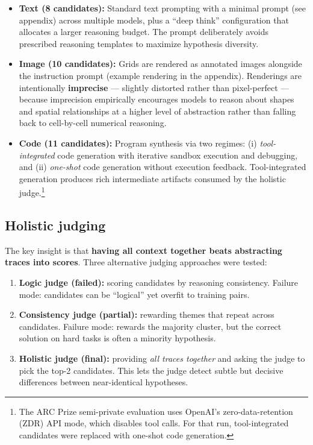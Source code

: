 \documentclass[10pt]{article}
\providecommand{\tightlist}{%
  \setlength{\itemsep}{0pt}\setlength{\parskip}{0pt}}
\begin{document}
\begin{itemize}
\tightlist
\item
  \textbf{Text (8 candidates):} Standard text prompting with a minimal
  prompt (see appendix) across multiple models, plus a ``deep think''
  configuration that allocates a larger reasoning budget. The prompt
  deliberately avoids prescribed reasoning templates to maximize
  hypothesis diversity.
\item
  \textbf{Image (10 candidates):} Grids are rendered as annotated images
  alongside the instruction prompt (example rendering in the appendix).
  Renderings are intentionally \textbf{imprecise} --- slightly distorted
  rather than pixel-perfect --- because imprecision empirically
  encourages models to reason about shapes and spatial relationships at
  a higher level of abstraction rather than falling back to cell-by-cell
  numerical reasoning.
\item
  \textbf{Code (11 candidates):} Program synthesis via two regimes: (i)
  \emph{tool-integrated} code generation with iterative sandbox
  execution and debugging, and (ii) \emph{one-shot} code generation
  without execution feedback. Tool-integrated generation produces rich
  intermediate artifacts consumed by the holistic judge.\footnote{The
    ARC Prize semi-private evaluation uses OpenAI's zero-data-retention
    (ZDR) API mode, which disables tool calls. For that run,
    tool-integrated candidates were replaced with one-shot code
    generation.}
\end{itemize}

\hypertarget{holistic-judging}{%
\subsection{Holistic judging}\label{holistic-judging}}

The key insight is that \textbf{having all context together beats
abstracting traces into scores}. Three alternative judging approaches
were tested:

\begin{enumerate}
\def\labelenumi{\arabic{enumi}.}
\tightlist
\item
  \textbf{Logic judge (failed):} scoring candidates by reasoning
  consistency. Failure mode: candidates can be ``logical'' yet overfit
  to training pairs.
\item
  \textbf{Consistency judge (partial):} rewarding themes that repeat
  across candidates. Failure mode: rewards the majority cluster, but the
  correct solution on hard tasks is often a minority hypothesis.
\item
  \textbf{Holistic judge (final):} providing \emph{all traces together}
  and asking the judge to pick the top-2 candidates. This lets the judge
  detect subtle but decisive differences between near-identical
  hypotheses.
\end{enumerate}
\end{document}

